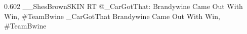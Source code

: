 %
%
%

{0.602}
{\joinNameTweet
{\_\_ShesBrownSKIN}
{RT @\_CarGotThat: Brandywine Came Out With Win, \#TeamBwine}}
{\joinNameTweet
{\_CarGotThat}
{Brandywine Came Out With Win, \#TeamBwine}}



